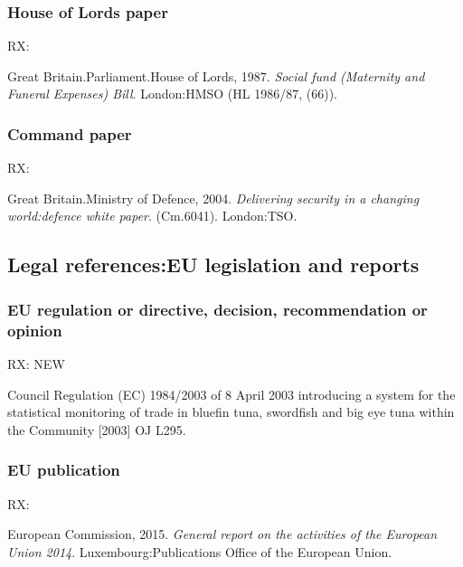 \subsubsection*{House of Lords paper}

RX: \cite{gb.hl1986/87-66}

Great Britain.\@ Parliament.\@ House of Lords, 1987. \emph{Social fund (Maternity and Funeral Expenses) Bill}. London:\@ HMSO (HL 1986/87, (66)).



\subsubsection*{Command paper}

RX: \cite{gb.cm6041}

Great Britain.\@ Ministry of Defence, 2004. \emph{Delivering security in a changing world:\@ defence white paper}. (Cm.\@ 6041). London:\@ TSO.



\subsection{Legal references:\@ EU legislation and reports}


\subsubsection*{EU regulation or directive, decision, recommendation or opinion}

RX: \cite{eu.dir1984/2003} NEW

Council Regulation (EC) 1984/2003 of 8 April 2003 introducing a system for the statistical monitoring of trade in bluefin tuna, swordfish and big eye tuna within the Community [2003] OJ L295.




\subsubsection*{EU publication}

RX: \cite{ec2015gra}

European Commission, 2015. \emph{General report on the activities of the European Union 2014}. Luxembourg:\@ Publications Office of the European Union.



